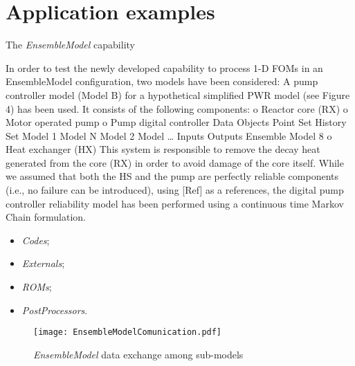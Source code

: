 \section{Application examples}
\label{sec:applications}
The \textit{EnsembleModel} capability 

In order to test the newly developed capability to process 1-D FOMs in an EnsembleModel configuration,
two models have been considered:
A pump controller model (Model B) for a hypothetical simplified PWR model (see Figure 4) has
been used. It consists of the following components:
o Reactor core (RX)
o Motor operated pump
o Pump digital controller
Data Objects
Point Set
History Set
Model 1
Model N Model 2
Model …
Inputs Outputs
Ensemble Model
8
o Heat exchanger (HX)
This system is responsible to remove the decay heat generated from the core (RX) in order to
avoid damage of the core itself. While we assumed that both the HS and the pump are perfectly
reliable components (i.e., no failure can be introduced), using [Ref] as a references, the digital
pump controller reliability model has been performed using a continuous time Markov Chain
formulation.



\begin{itemize}
   \item \textit{Codes};
   \item \textit{Externals};
   \item \textit{ROMs};
   \item \textit{PostProcessors}.
\end{itemize}


\begin{figure}
    \centering
    \texttt{[image: EnsembleModelComunication.pdf]}
    \caption{\textit{EnsembleModel} data exchange among sub-models}
    \label{fig:ensembleModelComunication}
\end{figure}

